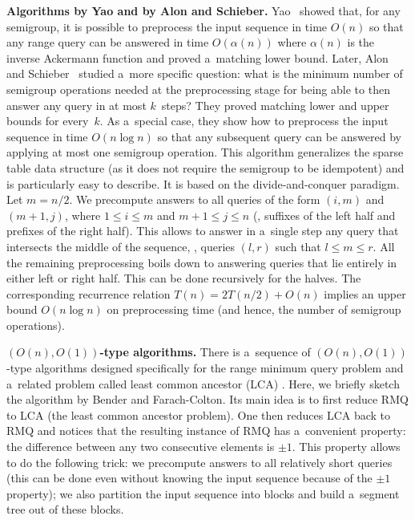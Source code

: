 \textbf{Algorithms by Yao and by Alon and Schieber.}
Yao~\cite{DBLP:conf/stoc/Yao82} showed that, for any semigroup, it is possible
to preprocess the input sequence in time $O(n)$ so that
%
%
%
any range query can be answered %
%
in time $O(\alpha(n))$ where $\alpha(n)$ is the inverse Ackermann function
and proved a~matching lower bound. Later, Alon and
Schieber~\cite{Alon87optimalpreprocessing} studied a~more specific question:
what is the minimum number of semigroup operations needed at the preprocessing
stage for being able to then answer any query in at most $k$~steps? They proved
matching lower and upper bounds for every~$k$. As a~special case, they show how
to preprocess the input sequence in time $O(n\log n)$ so that %
any subsequent query
can be answered %
by applying at most one semigroup operation. This algorithm
generalizes the sparse table data structure (as it does not require the
semigroup to be idempotent) and is particularly easy to describe. It is based on
the divide-and-conquer paradigm. Let $m=n/2$. We precompute answers to all
queries of the form $(i,m)$ and $(m+1,j)$, where $1 \le i \le m$ and
$m+1 \le j \le n$ (\ie, suffixes of the left half and prefixes of the right
half). This allows to answer in a~single step any query that intersects the
middle of the sequence, \ie, queries $(l,r)$ such that $l \le m \le r$. All the
remaining preprocessing boils down to answering queries that lie entirely in
either left or right half. This can be done recursively for the halves. The
corresponding recurrence relation $T(n)=2T(n/2)+O(n)$ implies an upper bound
$O(n\log n)$ on preprocessing time (and hence, the number of semigroup
operations).

\textbf{$(O(n), O(1))$-type algorithms.}
There is a~sequence of $(O(n), O(1))$-type algorithms designed specifically
%
for  %
the range minimum query problem and a~related problem called least common
ancestor (LCA) \cite{DBLP:journals/siamcomp/BerkmanV93,
    DBLP:journals/jal/BenderFPSS05,
    DBLP:conf/latin/BenderF00,
    DBLP:conf/cpm/FischerH06}. Here, we briefly sketch the algorithm by Bender and
Farach-Colton. Its main idea is to first reduce RMQ to LCA (the least common
ancestor problem). One then reduces LCA back to RMQ and notices that the
resulting instance of RMQ has a~convenient property: the difference between any
two consecutive elements is $\pm 1$. This property allows to do the following
trick: we precompute answers to all relatively short queries (this can be done
even without knowing the input sequence because of the $\pm 1$ property); we
also partition the input sequence into blocks and build a~segment tree out of
these blocks.

